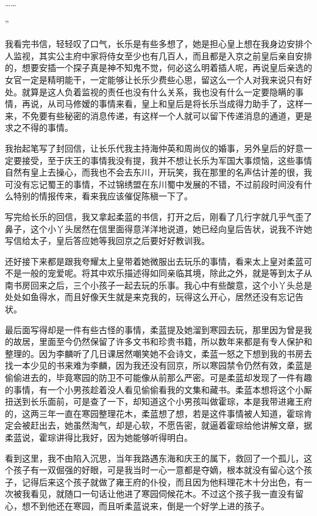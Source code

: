 ……

”

我看完书信，轻轻叹了口气，长乐是有些多想了，她是担心皇上想在我身边安排个人监视，其实公主府中家将侍女至少也有几百人，而且都是入京之前皇后亲自安排的，想要安插一个探子真是神不知鬼不觉，何必这么明着插人呢，再说皇后亲选的女官一定是精明能干，一定能够让长乐少费些心思，留这么一个人对我来说只有好处。就算是这人负着监视的责任也没有什么关系，我也没有什么一定要隐瞒的事情，再说，从司马修嫒的事情来看，皇上和皇后是将长乐当成得力助手了，这样一来，不免要有些秘密的消息传递，有这样一个人就可以留下传递消息的通道，更是求之不得的事情。

我抬起笔写了封回信，让长乐代我主持海仲英和周尚仪的婚事，另外皇后的好意一定要接受，至于庆王的事情我没有提，我并不想让长乐为军国大事烦恼，这些事情自然有皇上去操心，而我也不会去东川，开玩笑，我在那里的名声估计差的很，我可没有忘记蜀王的事情，不过锦绣盟在东川蜀中发展的不错，不过前段时间没有什么特别的情报传来，看来我应该催促陈稹一下了。

写完给长乐的回信，我又拿起柔蓝的书信，打开之后，刚看了几行字就几乎气歪了鼻子，这个小丫头居然在信里面得意洋洋地说道，她已经向皇后告状，说我不许她写信给太子，皇后答应她等我回京之后要好好教训我。

还好接下来都是跟我夸耀太上皇带着她微服出去玩乐的事情，看来太上皇对柔蓝可不是一般的宠爱呢。将其中欢乐描述得如同亲临其境，除此之外，就是等到太子从南书房回来之后，三个小孩子一起去玩的乐事。我心中有些酸意，这个小丫头总是处处如鱼得水，而且好像天生就是来克我的，玩得这么开心，居然还没有忘记告状。

最后面写得却是一件有些古怪的事情，柔蓝提及她溜到寒园去玩，那里因为曾是我的故居，里面至今仍然保留了许多文书和珍贵书籍，所以数年来都是有专人保护和整理的。因为李麟听了几日课居然嘲笑她不会诗文，柔蓝一怒之下想到我的书房去找一本少见的书来难为李麟，因为我还没有回京，所以寒园禁令仍然有效，柔蓝是偷偷进去的，毕竟寒园的防卫不可能像从前那么严密。可是柔蓝却发现了一件有趣的事情，有一个小男孩趁着没人看见偷偷看我的文集和藏书。柔蓝本想将这个小厮扭送到长乐面前，可是查了一下，却知道这个小男孩叫做霍琮，本是我带进雍王府的，这两三年一直在寒园整理花木，柔蓝想了想，若是这件事情被人知道，霍琮肯定会被赶出去，她虽然淘气，却是心软，不愿告密，就逼着霍琮给他讲解文章，据柔蓝说，霍琮讲得比我好，因为她能够听得明白。

看到这里，我不由陷入沉思，当年我路遇东海和庆王的属下，救回了一个孤儿，这个孩子有一双倔强的好眼，可是我当时一心一意都是夺嫡，根本就没有留心这个孩子，记得后来这个孩子就做了雍王府的仆役，而且因为他料理花木十分出色，有一次被我看见，就随口一句话让他进了寒园伺候花木。不过这个孩子我一直没有留心，想不到他还在寒园，而且听柔蓝说来，倒是一个好学上进的孩子。

